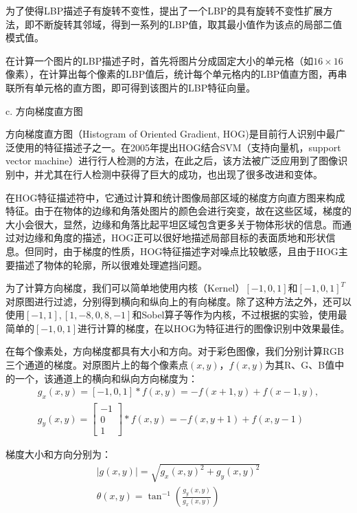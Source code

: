   为了使得LBP描述子有旋转不变性，\citet{ojala2002multiresolution}提出了一个LBP的具有旋转不变性扩展方法，即不断旋转其邻域，得到一系列的LBP值，取其最小值作为该点的局部二值模式值。

  在计算一个图片的LBP描述子时，首先将图片分成固定大小的单元格（如$16\times16$像素），在计算出每个像素的LBP值后，统计每个单元格内的LBP值直方图，再串联所有单元格的直方图，即可得到该图片的LBP特征向量。



  c. 方向梯度直方图

  方向梯度直方图（Histogram of Oriented Gradient, HOG)是目前行人识别中最广泛使用的特征描述子之一。\citet{dalal2005histograms}在2005年提出HOG结合SVM（支持向量机，support vector machine）进行行人检测的方法，在此之后，该方法被广泛应用到了图像识别中，并尤其在行人检测中获得了巨大的成功，也出现了很多改进和变体。

  在HOG特征描述符中，它通过计算和统计图像局部区域的梯度方向直方图来构成特征。由于在物体的边缘和角落处图片的颜色会进行突变，故在这些区域，梯度的大小会很大，显然，边缘和角落比起平坦区域包含更多关于物体形状的信息。而通过对边缘和角度的描述，HOG正可以很好地描述局部目标的表面质地和形状信息。但同时，由于梯度的性质，HOG特征描述字对噪点比较敏感，且由于HOG主要描述了物体的轮廓，所以很难处理遮挡问题。

  为了计算方向梯度，我们可以简单地使用内核（Kernel）$[-1,0,1]$和$[-1,0,1]^{T}$对原图进行过滤，分别得到横向和纵向上的有向梯度。除了这种方法之外，还可以使用$[-1,1],[1,-8,0,8,-1]$和Sobel算子等作为内核，不过根据\citet{dalal2005histograms}的实验，使用最简单的$[-1,0,1]$进行计算的梯度，在以HOG为特征进行的图像识别中效果最佳。

  在每个像素处，方向梯度都具有大小和方向。对于彩色图像，我们分别计算RGB三个通道的梯度。对原图片上的每个像素点$(x,y)$，$f(x,y)$为其R、G、B值中的一个，该通道上的横向和纵向方向梯度为：
\begin{gather*}
g_x(x,y)=[-1,0,1]\ast f(x,y)=-f(x+1,y)+f(x-1,y),\\
g_y(x,y)=\begin{bmatrix}
-1 \\
0 \\
1
\end{bmatrix}
\ast f(x,y) = -f(x,y+1)+f(x,y-1)
\end{gather*}

  梯度大小和方向分别为：
\begin{gather*}
|g(x,y)|=\sqrt{g_x (x,y)^2 + g_y (x,y)^2} \\
\theta (x,y)=\tan^{-1}\left(\frac{g_y(x,y)}{g_x(x,y)}\right)
\end{gather*}
  
